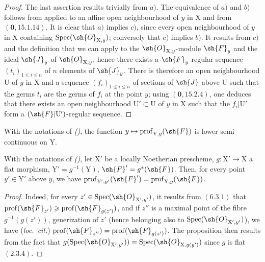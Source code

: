 \begin{proof}
The last assertion results trivially from $a)$. The equivalence of $a)$ and $b)$ follows from  applied to an affine open neighbourhood of $y$ in $\mathrm{X}$ and from $(\mathbf{0},15.1.14)$. It is clear that $a)$ implies $c)$, since every open neighbourhood of $y$ in $\mathrm{X}$ containing $\operatorname{Spec}(\sh{O}_{\mathrm{X},y})$; conversely that $c)$ implies $b)$. It results from $c)$ and the definition  that
we can apply  to the $\sh{O}_{\mathrm{X},y}$-module $\sh{F}_y$ and the ideal $\sh{J}_y$ of $\sh{O}_{\mathrm{X},y}$, hence there exists a $\sh{F}_y$-regular sequence $(t_i)_{1\leqslant i\leqslant n}$ of $n$ elements of $\sh{J}_y$. There is therefore an open neighbourhood $\mathrm{U}$ of $y$ in $\mathrm{X}$ and a sequence $(f_i)_{1\leqslant i\leqslant n}$ of sections of $\sh{J}$ above $\mathrm{U}$ such that the germs $t_i$ are the germs of $f_i$ at the point $y$; using $(\mathbf{0},15.2.4)$, one deduces that there exists an open neighbourhood $\mathrm{U}'\subset\mathrm{U}$ of $y$ in $\mathrm{X}$ such that the $f_i|\mathrm{U}'$ form a $(\sh{F}|\mathrm{U}')$-regular sequence.
\end{proof}

\begin{corollary}[19.9.4]
\label{IV.19.9.4}
With the notations of \emph{()}, the function $y\mapsto\operatorname{prof}_{\mathrm{Y},y}(\sh{F})$ is lower semi-continuous on $\mathrm{Y}$.
\end{corollary}

\begin{proposition}[19.9.5]
\label{IV.19.9.5}
With the notations of \emph{()}, let $\mathrm{X}'$ be a locally Noetherian prescheme, $g:\mathrm{X}'\to\mathrm{X}$ a flat morphism, $\mathrm{Y}'=g^{-1}(\mathrm{Y})$, $\sh{F}'=g^*(\sh{F})$. Then, for every point $y'\in\mathrm{Y}'$ above $y$, we have $\operatorname{prof}_{\mathrm{Y}',y'}(\sh{F}')=\operatorname{prof}_{\mathrm{Y},y}(\sh{F})$.
\end{proposition}

\begin{proof}
Indeed, for every $z'\in\operatorname{Spec}(\sh{O}_{\mathrm{X}',y'})$, it results from $(6.3.1)$ that $\operatorname{prof}(\sh{F}_{z'})\geqslant\operatorname{prof}(\sh{F}_{g(z')})$, and if $z''$ is a maximal point of the fibre $g^{-1}(g(z'))$, generization of $z'$ (hence belonging also to $\operatorname{Spec}(\sh{O}_{\mathrm{X}',y'})$), we have (\emph{loc.~cit.}) $\operatorname{prof}(\sh{F}_{z''})=\operatorname{prof}(\sh{F}_{g(z')})$. The proposition then results from the fact that $g(\operatorname{Spec}(\sh{O}_{\mathrm{X}',y'}))=\operatorname{Spec}(\sh{O}_{\mathrm{X},g(y')})$ since $g$ is flat $(2.3.4)$.
\end{proof}

